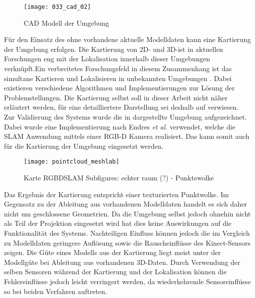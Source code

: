 \begin{figure}[ht]
	\begin{center}
		\texttt{[image: 033\_cad\_02]}
		\caption{CAD Modell der Umgebung}
		\label{fig.mapMod}
	\end{center}
\end{figure}

Für den Einsatz des  ohne vorhandene aktuelle Modelldaten kann eine Kartierung \red[(Mapping)] der Umgebung erfolgen. Die Kartierung von 2D- und 3D- ist in aktuellen Forschungen eng mit der Lokalisation innerhalb dieser Umgebungen verknüpft. Ein verbreitetes Forschungsfeld in diesem Zusammenhang ist das simultane Kartieren und Lokalisieren in unbekannten Umgebungen . Dabei existieren verschiedene Algorithmen und Implementierungen zur Lösung der Problemstellungen. Die Kartierung selbst soll in dieser Arbeit nicht näher erläutert werden, für eine detailliertere Darstellung sei deshalb auf  verwiesen.\\

Zur Validierung des Systems wurde die in  dargestellte Umgebung aufgezeichnet. Dabei wurde eine Implementierung \cite{Rgbdslam} nach Endres \textit{et al.} \cite{Endres2014} verwendet, welche die SLAM Anwendung mittels einer RGB-D Kamera realisiert. Das \kps{} kann somit auch für die Kartierung der Umgebung eingesetzt werden.\\

\begin{figure}[ht]
	\begin{center}
		\texttt{[image: pointcloud\_meshlab]}
		\caption{Karte RGBDSLAM Subfigures: echter raum (?) - Punktewolke}
		\label{fig.mapSLAM}
	\end{center}
\end{figure}

Das Ergebnis der Kartierung entspricht einer texturierten Punktwolke. Im Gegensatz zu der Ableitung aus vorhandenen Modelldaten handelt es sich daher nicht um geschlossene Geometrien. Da die Umgebung selbst jedoch ohnehin nicht als Teil der Projektion eingesetzt wird hat dies keine Auswirkungen auf die Funktionalität des Systems. Nachteiligen Einfluss können jedoch die im Vergleich zu Modelldaten geringere Auflösung sowie die Rauscheinflüsse des Kinect-Sensors zeigen. Die Güte eines Modells aus der Kartierung liegt meist unter der Modellgüte bei Ableitung aus vorhandenen 3D-Daten. Durch Verwendung der selben Sensoren während der Kartierung und der Lokalisation können die Fehlereinflüsse jedoch leicht verringert werden, da wiederkehrende Sensoreinflüsse so bei beiden Verfahren auftreten.\\

